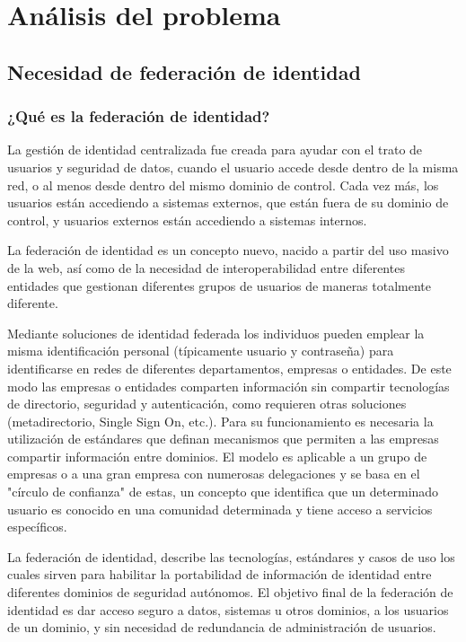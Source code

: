\chapter{Análisis del problema}
    \section{Necesidad de federación de identidad}
        \subsection{¿Qué es la federación de identidad?}


    La gestión de identidad centralizada fue creada para ayudar con el
    trato de usuarios y seguridad de datos, cuando el usuario accede
    desde dentro de la misma red, o al menos desde dentro del mismo
    dominio de control. Cada vez más, los usuarios están accediendo a
    sistemas externos, que están fuera de su dominio de control, y
    usuarios externos están accediendo a sistemas internos.

    La federación de identidad es un concepto nuevo, nacido a partir
    del uso masivo de la web, así como de la necesidad de
    interoperabilidad entre diferentes entidades que gestionan
    diferentes grupos de usuarios de maneras totalmente diferente.

    Mediante soluciones de identidad federada los individuos pueden
    emplear la misma identificación personal (típicamente usuario y
    contraseña) para identificarse en redes de diferentes
    departamentos, empresas o entidades. De este modo las empresas o
    entidades comparten información sin compartir tecnologías de
    directorio, seguridad y autenticación, como requieren otras
    soluciones (metadirectorio, Single Sign On, etc.). Para su
    funcionamiento es necesaria la utilización de estándares que
    definan mecanismos que permiten a las empresas compartir
    información entre dominios. El modelo es aplicable a un grupo de
    empresas o a una gran empresa con numerosas delegaciones y se basa
    en el "círculo de confianza" de estas, un concepto que identifica
    que un determinado usuario es conocido en una comunidad
    determinada y tiene acceso a servicios específicos.

    La federación de identidad, describe las tecnologías, estándares y
    casos de uso los cuales sirven para habilitar la portabilidad de
    información de identidad entre diferentes dominios de seguridad
    autónomos. El objetivo final de la federación de identidad es dar
    acceso seguro a datos, sistemas u otros dominios, a los usuarios
    de un dominio, y sin necesidad de redundancia de administración de
    usuarios.


